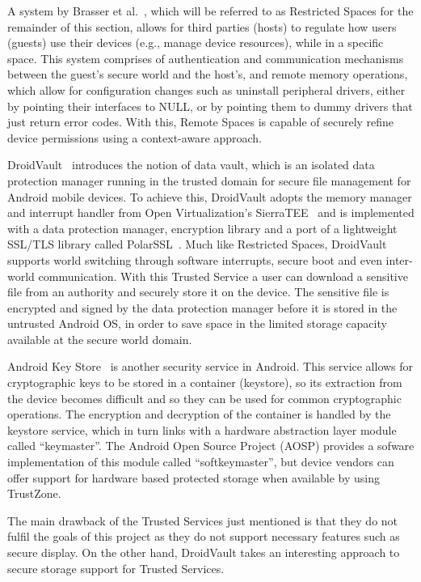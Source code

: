 A system by Brasser et al.~\cite{brasserregulating}, which will be referred to as Restricted Spaces for the remainder of this section, allows for third parties (hosts) to regulate how users (guests) use their devices (e.g., manage device resources), while in a specific space. This system comprises of authentication and communication mechanisms between the guest's secure world and the host's, and remote memory operations, which allow for configuration changes such as uninstall peripheral drivers, either by pointing their interfaces to NULL, or by pointing them to dummy drivers that just return error codes. With this, Remote Spaces is capable of securely refine device permissions using a context-aware approach.

DroidVault~\cite{li2014droidvault} introduces the notion of data vault, which is an isolated data protection manager running in the trusted domain for secure file management for Android mobile devices. To achieve this, DroidVault adopts the memory manager and interrupt handler from Open Virtualization's SierraTEE~\cite{sierra_tee} and is implemented with a data protection manager, encryption library and a port of a lightweight SSL/TLS library called PolarSSL~\cite{polar}. Much like Restricted Spaces, DroidVault supports world switching through software interrupts, secure boot and even inter-world communication. With this Trusted Service a user can download a sensitive file from an authority and securely store it on the device. The sensitive file is encrypted and signed by the data protection manager before it is stored in the untrusted Android OS, in order to save space in the limited storage capacity available at the secure world domain.

Android Key Store~\cite{aks} is another security service in Android. This service allows for cryptographic keys to be stored in a container (keystore), so its extraction from the device becomes difficult and so they can be used for common cryptographic operations. The encryption and decryption of the container is handled by the keystore service, which in turn links with a hardware abstraction layer module called ``keymaster''. The Android Open Source Project (AOSP) provides a sofware implementation of this module called ``softkeymaster'', but device vendors can offer support for hardware based protected storage when available by using TrustZone.

The main drawback of the Trusted Services just mentioned is that they do not fulfil the goals of this project as they do not support necessary features such as secure display. On the other hand, DroidVault takes an interesting approach to secure storage support for Trusted Services.

